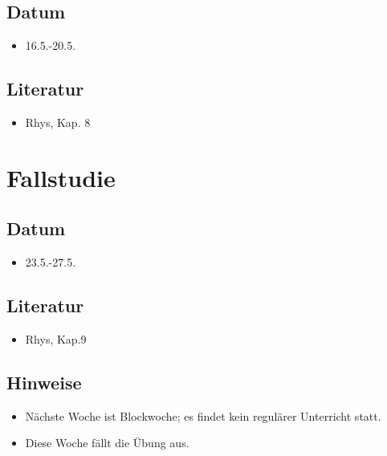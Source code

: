 \documentclass[
]{book}
\providecommand{\tightlist}{%
  \setlength{\itemsep}{0pt}\setlength{\parskip}{0pt}}
\begin{document}
\hypertarget{datum-9}{%
\subsection{Datum}\label{datum-9}}

\begin{itemize}
\tightlist
\item
  16.5.-20.5.
\end{itemize}

\hypertarget{literatur-9}{%
\subsection{Literatur}\label{literatur-9}}

\begin{itemize}
\tightlist
\item
  Rhys, Kap. 8
\end{itemize}

\hypertarget{fallstudie}{%
\section{Fallstudie}\label{fallstudie}}

\hypertarget{datum-10}{%
\subsection{Datum}\label{datum-10}}

\begin{itemize}
\tightlist
\item
  23.5.-27.5.
\end{itemize}

\hypertarget{literatur-10}{%
\subsection{Literatur}\label{literatur-10}}

\begin{itemize}
\tightlist
\item
  Rhys, Kap.9
\end{itemize}

\hypertarget{hinweise-3}{%
\subsection{Hinweise}\label{hinweise-3}}

\begin{itemize}
\tightlist
\item
  Nächste Woche ist Blockwoche; es findet kein regulärer Unterricht statt.
\item
  Diese Woche fällt die Übung aus.
\end{itemize}
\end{document}
